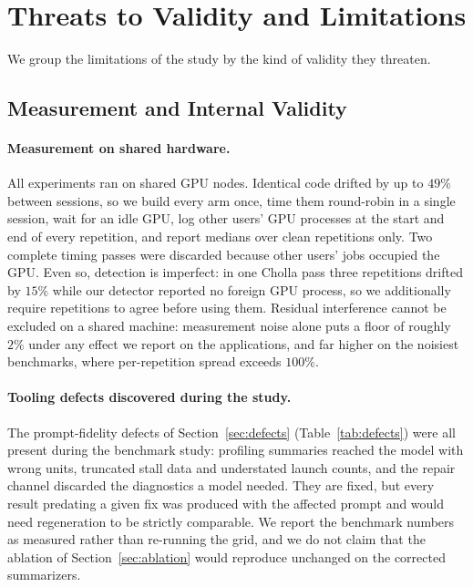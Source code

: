 \section{Threats to Validity and Limitations}
\label{sec:limits}
We group the limitations of the study by the kind of validity they threaten.

\subsection{Measurement and Internal Validity}
\paragraph{Measurement on shared hardware.}
All experiments ran on shared GPU nodes. Identical code drifted by up to $49\%$ between sessions, so we
build every arm once, time them round-robin in a single session, wait for an idle GPU, log other users'
GPU processes at the start and end of every repetition, and report medians over clean repetitions only.
Two complete timing passes were discarded because other users' jobs occupied the GPU. Even so,
detection is imperfect: in one Cholla pass three repetitions drifted by $15\%$ while our detector
reported no foreign GPU process, so we additionally require repetitions to agree before using them.
Residual interference cannot be excluded on a shared machine: measurement noise alone puts a floor of
roughly $2\%$ under any effect we report on the applications, and far higher on the noisiest benchmarks,
where per-repetition spread exceeds $100\%$.

\paragraph{Tooling defects discovered during the study.}
The prompt-fidelity defects of Section~\ref{sec:defects} (Table~\ref{tab:defects}) were all present
during the benchmark study: profiling summaries reached the model with wrong units, truncated
stall data and understated launch counts, and the repair channel discarded the diagnostics a model
needed. They are fixed, but every result predating a given fix was produced with the affected prompt
and would need regeneration to be strictly comparable. We report the benchmark numbers as measured
rather than re-running the grid, and we do not claim that the ablation of Section~\ref{sec:ablation}
would reproduce unchanged on the corrected summarizers.

